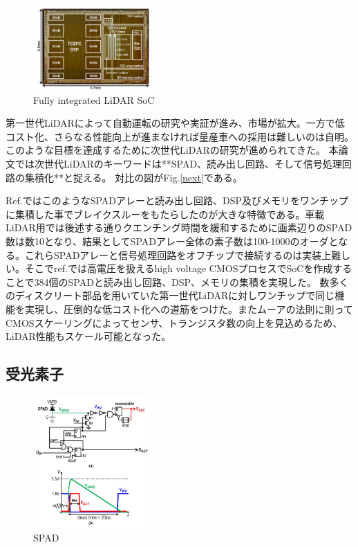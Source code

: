 \documentclass[letterpaper, 10 pt, conference]{ieeeconf}  %
\begin{document}
\begin{figure}[!t]
\centering
 \includegraphics[width=0.4\textwidth]{figs/niclasschip.png}
  \caption{Fully integrated LiDAR SoC \cite{niclass2012100}}
\label{chip}
\end{figure}

第一世代LiDARによって自動運転の研究や実証が進み、市場が拡大。一方で低コスト化、さらなる性能向上が進まなければ量産車への採用は難しいのは自明。このような目標を達成するために次世代LiDARの研究が進められてきた。
本論文では次世代LiDARのキーワードは**SPAD、読み出し回路、そして信号処理回路の集積化**と捉える。
対比の図がFig.\ref{next}である。

Ref.\cite{niclass2012100}ではこのようなSPADアレーと読み出し回路、DSP及びメモリをワンチップに集積した事でブレイクスルーをもたらしたのが大きな特徴である。車載LiDAR用では後述する通りクエンチング時間を緩和するために画素辺りのSPAD数は数10となり、結果としてSPADアレー全体の素子数は100-1000のオーダとなる。これらSPADアレーと信号処理回路をオフチップで接続するのは実装上難しい。そこでref.\cite{niclass2012100}では高電圧を扱えるhigh voltage CMOSプロセスでSoCを作成することで384個のSPADと読み出し回路、DSP、メモリの集積を実現した。
数多くのディスクリート部品を用いていた第一世代LiDARに対しワンチップで同じ機能を実現し、圧倒的な低コスト化への道筋をつけた。またムーアの法則に則ってCMOSスケーリングによってセンサ、トランジスタ数の向上を見込めるため、LiDAR性能もスケール可能となった。


\subsection{受光素子}
\begin{figure}[!t]
\centering
 \includegraphics[width=0.4\textwidth]{figs/spad.png}
  \caption{SPAD \cite{niclass2012100}}
\label{spad}
\end{figure}
\end{document}
